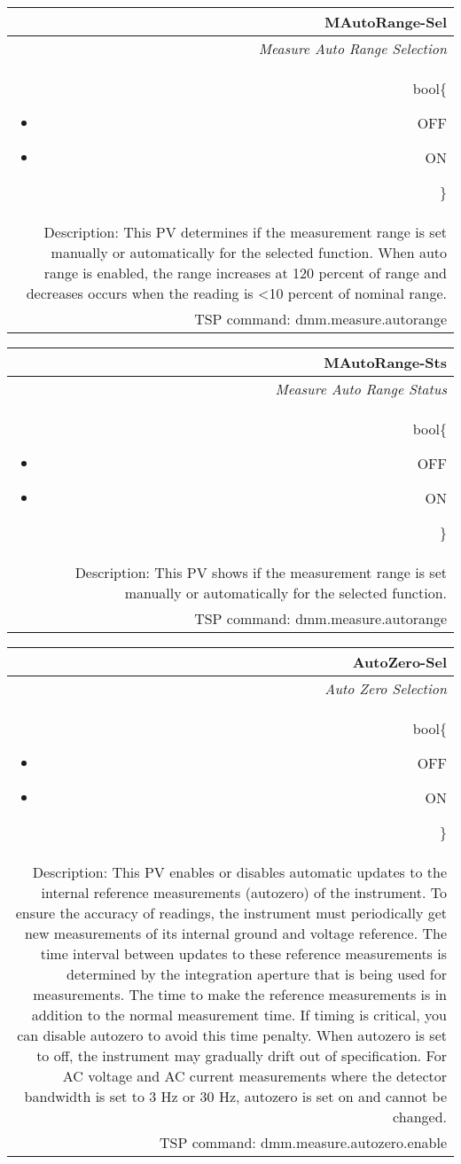 \documentclass[openany]{article}
\begin{document}
		\begin{tabular}{N}
			\hline
			\bfseries MAutoRange-Sel\label{pv:mautorange-sel} \\ \hline
			\emph{Measure Auto Range Selection} \\
			bool\{\begin{itemize}[noitemsep]
				\small
				\item[] OFF
				\item[] ON
			\end{itemize}\} \\
			Description: This PV determines if the measurement range is set manually or automatically for the selected function. When auto range is enabled, the range increases at 120 percent of range and decreases occurs when the reading is \textless 10 percent of nominal range. \\
			TSP command: dmm.measure.autorange
		\end{tabular}

		\begin{tabular}{N}
			\hline
			\bfseries MAutoRange-Sts\label{pv:mautorange-sts} \\ \hline
			\emph{Measure Auto Range Status} \\
			bool\{\begin{itemize}[noitemsep]
				\small
				\item[] OFF
				\item[] ON
			\end{itemize}\} \\
			Description: This PV shows if the measurement range is set manually or automatically for the selected function.\\
			TSP command: dmm.measure.autorange
		\end{tabular}

		\begin{tabular}{N}
			\hline
			\bfseries AutoZero-Sel\label{pv:autozero-sel} \\ \hline
			\emph{Auto Zero Selection} \\
			bool\{\begin{itemize}[noitemsep]
				\small
				\item[] OFF
				\item[] ON
			\end{itemize}\} \\
			Description: This PV enables or disables automatic updates to the internal reference measurements (autozero) of the instrument. To ensure the accuracy of readings, the instrument must periodically get new measurements of its internal ground and voltage reference. The time interval between updates to these reference measurements is determined by the integration aperture that is being used for measurements. The time to make the reference measurements is in addition to the normal measurement time. If timing is critical, you can disable autozero to avoid this time penalty. When autozero is set to off, the instrument may gradually drift out of specification. For AC voltage and AC current measurements where the detector bandwidth is set to 3 Hz or 30 Hz, autozero is set on and cannot be changed. \\
			TSP command: dmm.measure.autozero.enable
		\end{tabular}
\end{document}
